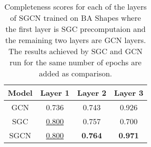 \begin{table}
    \centering
    \begin{tabular}{c|c|cc}
        \textbf{Model} & \textbf{Layer 1} & \textbf{Layer 2} & \textbf{Layer 3} \\
        \midrule
        GCN     & 0.736 & 0.743 & 0.926 \\
        SGC     & \underline{0.800} & 0.757 & 0.700 \\
        \midrule
        SGCN    & \underline{0.800} & \textbf{0.764} & \textbf{0.971} \\
    \end{tabular}
    \caption{Completeness scores for each of the layers of SGCN trained on BA Shapes where the first layer is SGC precomputaion and the remaining two layers are GCN layers. The results achieved by SGC and GCN run for the same number of epochs are added as comparison.}
    \label{tab:SGCN-completeness}
\end{table}

